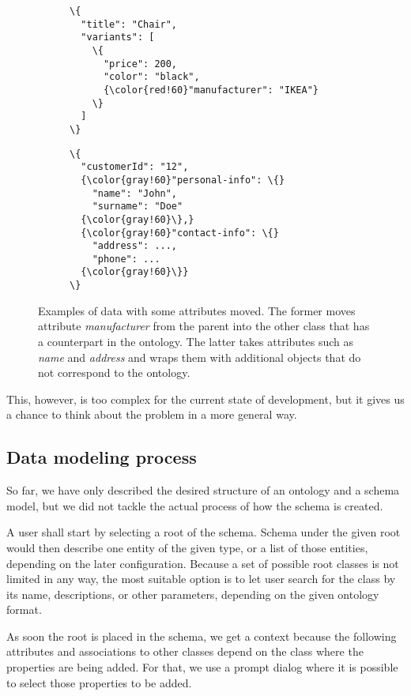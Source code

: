 \begin{figure}[h!]\centering
  \begin{subfigure}[b]{.5\textwidth}
    \begin{Verbatim}[commandchars=\\\{\}]
\{
  "title": "Chair",
  "variants": [
    \{
      "price": 200,
      "color": "black",
      {\color{red!60}"manufacturer": "IKEA"}
    \}
  ]
\}
    \end{Verbatim}
  \end{subfigure}%
  \begin{subfigure}[b]{.5\textwidth}
    \begin{Verbatim}[commandchars=\\\{\}]
\{
  "customerId": "12",
  {\color{gray!60}"personal-info": \{}
    "name": "John",
    "surname": "Doe"
  {\color{gray!60}\},}
  {\color{gray!60}"contact-info": \{}
    "address": ...,
    "phone": ...
  {\color{gray!60}\}}
\}
    \end{Verbatim}
    \end{subfigure}%
  \caption{Examples of data with some attributes moved. The former moves attribute \textit{manufacturer} from the parent into the other class that has a counterpart in the ontology. The latter takes attributes such as \textit{name} and \textit{address} and wraps them with additional objects that do not correspond to the ontology.}
\end{figure}

This, however, is too complex for the current state of development, but it gives us a chance to think about the problem in a more general way.

\subsection*{Data modeling process}

So far, we have only described the desired structure of an ontology and a schema model, but we did not tackle the actual process of how the schema is created.

A user shall start by selecting a root of the schema. Schema under the given root would then describe one entity of the given type, or a list of those entities, depending on the later configuration. Because a set of possible root classes is not limited in any way, the most suitable option is to let user search for the class by its name, descriptions, or other parameters, depending on the given ontology format.

As soon the root is placed in the schema, we get a context because the following attributes and associations to other classes depend on the class where the properties are being added. For that, we use a prompt dialog where it is possible to select those properties to be added.

